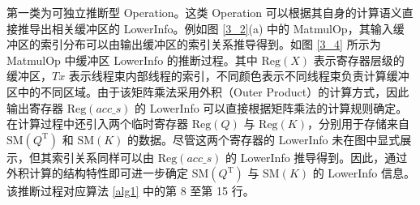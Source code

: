 第一类为可独立推断型 Operation。这类 Operation 可以根据其自身的计算语义直接推导出相关缓冲区的 LowerInfo。例如图 \ref{3_2}(a) 中的 MatmulOp，其输入缓冲区的索引分布可以由输出缓冲区的索引关系推导得到。如图 \ref{3_4} 所示为 MatmulOp 中缓冲区 LowerInfo 的推断过程。其中 $\mathrm{Reg}(X)$ 表示寄存器层级的缓冲区，$Tx$ 表示线程束内部线程的索引，不同颜色表示不同线程束负责计算缓冲区中的不同区域。由于该矩阵乘法采用外积（Outer Product）的计算方式，因此输出寄存器 $\mathrm{Reg}(acc\_s)$ 的 LowerInfo 可以直接根据矩阵乘法的计算规则确定。在计算过程中还引入两个临时寄存器 $\mathrm{Reg}(Q)$ 与 $\mathrm{Reg}(K)$，分别用于存储来自 $\mathrm{SM}(Q^{\mathrm{T}})$ 和 $\mathrm{SM}(K)$ 的数据。尽管这两个寄存器的 LowerInfo 未在图中显式展示，但其索引关系同样可以由 $\mathrm{Reg}(acc\_s)$ 的 LowerInfo 推导得到。因此，通过外积计算的结构特性即可进一步确定 $\mathrm{SM}(Q^{\mathrm{T}})$ 与 $\mathrm{SM}(K)$ 的 LowerInfo 信息。该推断过程对应算法 \ref{alg1} 中的第 8 至第 15 行。

\DontPrintSemicolon

\SetAlFnt{\xiaosi} %
\SetAlCapFnt{\xiaosi} %

